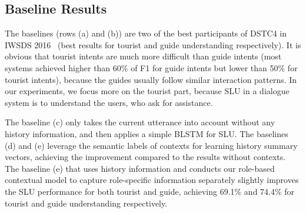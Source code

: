 \documentclass{article}
\begin{document}
\subsection{Baseline Results}

The baselines (rows (a) and (b)) are two of the best participants of DSTC4 in IWSDS 2016~\cite{kim2016fourth} (best results for tourist and guide understanding respectively).
It is obvious that tourist intents are much more difficult than guide intents (most systems achieved higher than 60\% of F1 for guide intents but lower than 50\% for tourist intents), because the guides usually follow similar interaction patterns. 
In our experiments, we focus more on the tourist part, because SLU in a dialogue system is to understand the users, who ask for assistance.

The baseline (c) only takes the current utterance into account without any history information, and then applies a simple BLSTM for SLU. 
The baselines (d) and (e) leverage the semantic labels of contexts for learning history summary vectors, achieving the improvement compared to the results without contexts.
The baseline (e) that uses history information and conducts our role-based contextual model to capture role-specific information separately slightly improves the SLU performance for both tourist and guide, achieving 69.1\% and 74.4\% for tourist and guide understanding respectively.

\end{document}
